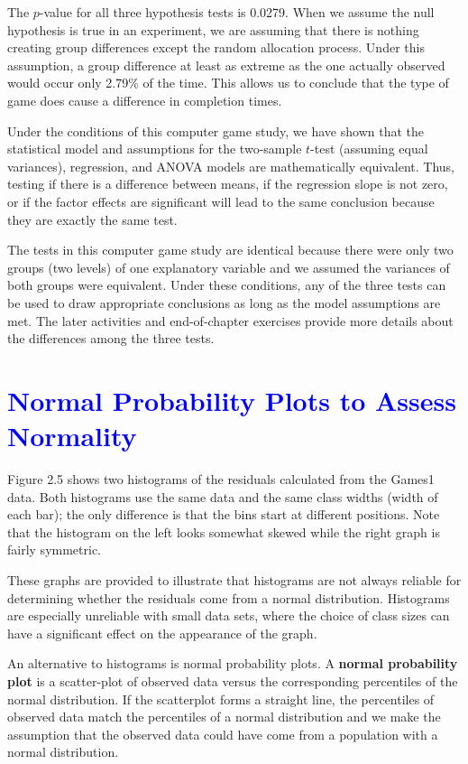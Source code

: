 \documentclass[
]{report}
\begin{document}
The \(\scriptstyle p\)-value for all three hypothesis tests is 0.0279. When we assume the null hypothesis is true in an experiment, we are assuming that there is nothing creating group differences except the random allocation process. Under this assumption, a group difference at least as extreme as the one actually observed would occur only 2.79\% of the time. This allows us to conclude that the type of game does cause a difference in completion times.

Under the conditions of this computer game study, we have shown that the statistical model and assumptions for the two-sample \(\scriptstyle t\)-test (assuming equal variances), regression, and ANOVA models are mathematically equivalent. Thus, testing if there is a difference between means, if the regression slope is not zero, or if the factor effects are significant will lead to the same conclusion because they are exactly the same test.

The tests in this computer game study are identical because there were only two groups (two levels) of one explanatory variable and we assumed the variances of both groups were equivalent. Under these conditions, any of the three tests can be used to draw appropriate conclusions as long as the model assumptions are met. The later activities and end-of-chapter exercises provide more details about the differences among the three tests.

\hypertarget{section-21}{%
\section{\texorpdfstring{\textcolor{blue}{ Normal Probability Plots to Assess Normality}}{}}\label{section-21}}

Figure 2.5 shows two histograms of the residuals calculated from the Games1 data. Both histograms use the same data and the same class widths (width of each bar); the only difference is that the bins start at different positions. Note that the histogram on the left looks somewhat skewed while the right graph is fairly symmetric.

These graphs are provided to illustrate that histograms are not always reliable for determining whether the residuals come from a normal distribution. Histograms are especially unreliable with small data sets, where the choice of class sizes can have a significant effect on the appearance of the graph.

An alternative to histograms is normal probability plots. A \textbf{normal probability plot} is a scatter-plot of observed data versus the corresponding percentiles of the normal distribution. If the scatterplot forms a straight line, the percentiles of observed data match the percentiles of a normal distribution and we make the assumption that the observed data could have come from a population with a normal distribution.
\end{document}
